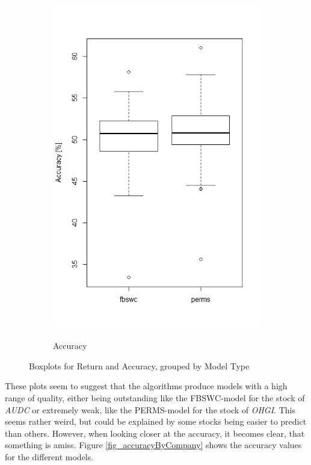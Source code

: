 \begin{figure}[h]
\begin{subfigure}{.5\textwidth}
  \includegraphics[width=\linewidth]{boxplotAccuracy}
  \label{fig_accuracyBoxplot}
  \caption{Accuracy}
\end{subfigure}
\caption[Rate of Return and Accuracy Boxplots]{Boxplots for Return and Accuracy, grouped by Model Type}
\label{fig_returnBoxplots}
\end{figure}

These plots seem to suggest that the algorithms produce models with a high range of quality, either being outstanding like the FBSWC-model for the stock of \textit{AUDC} or extremely weak, like the PERMS-model for the stock of \textit{OHGI}. This seems rather weird, but could be explained by some stocks being easier to predict than others. However, when looking closer at the accuracy, it becomes clear, that something is amiss. Figure \ref{fig_accuracyByCompany} shows the accuracy values for the different models. 

